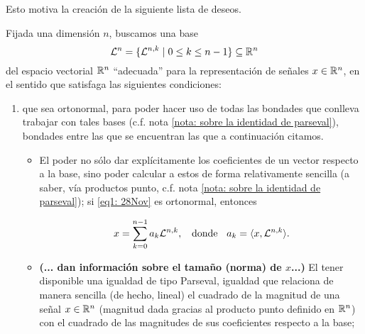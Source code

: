 Esto motiva la
creación de la siguiente lista de deseos.


\noindent 
\begin{listaObj}
\label{lista de objetivos}
Fijada una dimensión $n$, 
buscamos una base 
\begin{equation}
\label{eq1: 28Nov}
\mathcal{L}^{n}=\{ \mathcal{L}^{n,k} \hspace{0.1cm} |
\hspace{0.1cm} 0 \leq k \leq n-1  \} \subseteq \mathbb{R}^{n} 
\end{equation}
del espacio vectorial
$\mathbb{R}^{n}$ ``adecuada'' para la representación de señales
$x \in \mathbb{R}^{n}$,
en el sentido que satisfaga
las siguientes condiciones: 

\begin{enumerate}
\item 
que
sea ortonormal, para poder hacer uso de todas
las bondades que conlleva 
trabajar con tales bases
(c.f. nota \ref{nota: sobre la identidad de parseval}), 
bondades entre las que se encuentran
las que a continuación citamos.
\begin{itemize}
\item 
\textbf{}
El poder no sólo dar explícitamente los coeficientes
de un vector respecto a la base, 
sino poder calcular a estos
de forma relativamente sencilla (a saber, vía productos punto,
c.f. nota \ref{nota: sobre la identidad de parseval}); si
\eqref{eq1: 28Nov} es ortonormal, entonces

\begin{equation}
\label{eq2: 13Feb}
x= \sum\limits_{k=0}^{n-1}a_{k}\mathcal{L}^{n,k},
\hspace{0.2cm} \text{ donde } \hspace{0.2cm}
a_{k}= \langle x , \mathcal{L}^{n,k} \rangle.
\end{equation}
\item
\textbf{\textcolor{ameMorado}{(... dan información sobre el tamaño (norma) de $x$...)}}
El tener disponible una igualdad de tipo Parseval, igualdad que
relaciona de manera sencilla (de hecho, lineal)
el cuadrado de
la magnitud de una señal $x \in \mathbb{R}^{n}$ (magnitud dada
gracias al producto punto definido en $\mathbb{R}^{n}$)
con el cuadrado de las magnitudes de sus coeficientes
respecto a la base;


\end{itemize}
\end{enumerate}
\end{listaObj}
